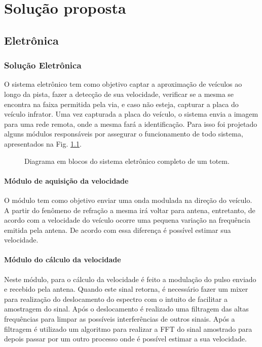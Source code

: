 \chapter{Solução proposta}
\section{Eletrônica}


\subsection{Solução Eletrônica}
O sistema eletrônico tem como objetivo captar a aproximação de veículos ao longo da pista, fazer a detecção de sua velocidade, verificar se a mesma se encontra na faixa permitida pela via, e caso não esteja, capturar a placa do veículo infrator. Uma vez capturada a placa do veículo, o sistema envia a imagem para uma rede remota, onde a mesma fará a identificação. Para isso foi projetado alguns módulos responsáveis por assegurar o funcionamento de todo sistema, apresentados na Fig. \ref{fig:sistemacompleto}.

\begin{figure}[h]
	\caption{\label{fig:sistemacompleto} Diagrama em blocos do sistema eletrônico completo de um totem.}
\end{figure}


\subsubsection{Módulo de aquisição da velocidade}
 O módulo tem como objetivo enviar uma onda modulada na direção do veículo. A partir do fenômeno de refração a mesma irá voltar para antena, entretanto, de acordo com a velocidade do veículo ocorre uma pequena variação na frequência emitida pela antena. De acordo com essa diferença é possível estimar sua velocidade. 


\subsubsection{Módulo do cálculo da velocidade}
Neste módulo, para o cálculo da velocidade é feito a modulação do pulso enviado e recebido pela antena. Quando este sinal retorna, é necessário fazer um mixer para realização do deslocamento do espectro com o intuito de facilitar a amostragem do sinal. Após o deslocamento é realizado uma filtragem das altas frequências para limpar as possíveis interferências de outros sinais. Após a filtragem é utilizado um algoritmo para realizar a FFT do sinal amostrado para depois passar por um outro processo onde é possível estimar a sua velocidade.

